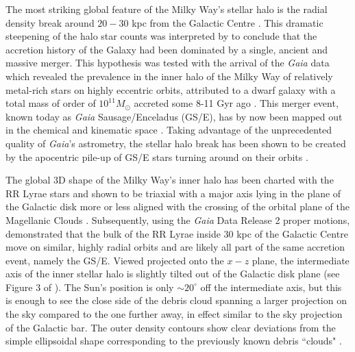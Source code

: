 \documentclass[a4paper,useAMS,usenatbib]{mnras}
\begin{document}
The most striking global feature of the Milky Way's stellar halo is the radial density break around $20-30$ kpc from the Galactic Centre \citep[see e.g.][]{Keller2008, Watkins2009,Deason2011,Sesar2011}. This dramatic steepening of the halo star counts was interpreted by \citet{Deason2013} to conclude that the accretion history of the Galaxy had been dominated by a single, ancient and massive merger. This hypothesis was tested with the arrival of the {\it Gaia} data \citep[][]{Gaia} which revealed the prevalence in the inner halo of the Milky Way of relatively metal-rich stars on highly eccentric orbits, attributed to a dwarf galaxy with a total mass of order of $10^{11} M_{\odot}$ accreted some 8-11 Gyr ago \citep[][]{Belokurov2018,Helmi2018}. This merger event, known today as {\it Gaia} Sausage/Enceladus (GS/E), has by now been mapped out in the chemical and kinematic space \citep[e.g.][]{Haywood2018,Mackereth2019,Necib2019,Lancaster2019,Das2020,Feuillet2021,Carrilo2022}. Taking advantage of the unprecedented quality of {\it Gaia}'s astrometry, the stellar halo break has been shown to be created by the apocentric pile-up of GS/E stars turning around on their orbits \citep[][]{Deason2018}. 

The global 3D shape of the Milky Way's inner halo has been charted with the RR Lyrae stars and shown to be triaxial with a major axis lying in the plane of the Galactic disk more or less aligned with the crossing of the orbital plane of the Magellanic Clouds \citep[][]{Iorio2018}. Subsequently, using the {\it Gaia} Data Release 2 proper motions, \citet{Iorio2019} demonstrated that the bulk of the RR Lyrae inside 30 kpc of the Galactic Centre move on similar, highly radial orbits and are likely all part of the same accretion event, namely the GS/E. Viewed projected onto the $x-z$ plane, the  intermediate axis of the inner stellar halo is slightly tilted out of the Galactic disk plane (see Figure 3 of \citealt{Iorio2019}). The Sun's position is only $\sim20^{\circ}$ off the intermediate axis, but this is enough to see the close side of the debris cloud spanning a larger projection on the sky compared to the one further away, in effect similar to the sky projection of the Galactic bar. The outer density contours show clear deviations from the simple ellipsoidal shape corresponding to the previously known debris ``clouds" \citep[][]{Simion2019,Balbinot2021}.
\end{document}
